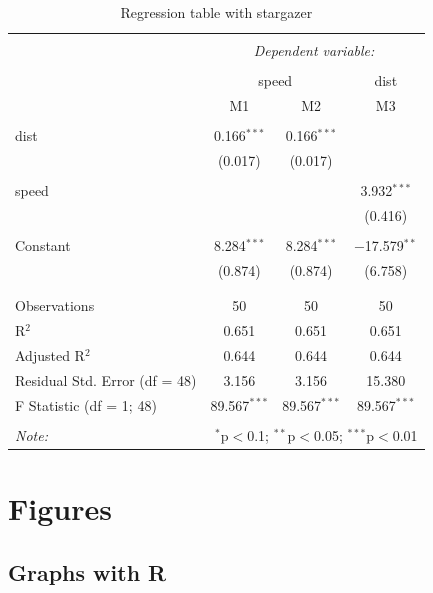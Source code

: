 \documentclass[
  12pt,
]{article}
\begin{document}
\begin{table}[h] \centering 
  \caption{Regression table with stargazer} 
  \label{tab2} 
\begin{tabular}{@{\extracolsep{5pt}}lccc} 
\\[-1.8ex]\hline 
\hline \\[-1.8ex] 
 & \multicolumn{3}{c}{\textit{Dependent variable:}} \\ 
\cline{2-4} 
\\[-1.8ex] & \multicolumn{2}{c}{speed} & dist \\ 
 & M1 & M2 & M3 \\ 
\hline \\[-1.8ex] 
 dist & 0.166$^{***}$ & 0.166$^{***}$ &  \\ 
  & (0.017) & (0.017) &  \\ 
  & & & \\ 
 speed &  &  & 3.932$^{***}$ \\ 
  &  &  & (0.416) \\ 
  & & & \\ 
 Constant & 8.284$^{***}$ & 8.284$^{***}$ & $-$17.579$^{**}$ \\ 
  & (0.874) & (0.874) & (6.758) \\ 
  & & & \\ 
\hline \\[-1.8ex] 
Observations & 50 & 50 & 50 \\ 
R$^{2}$ & 0.651 & 0.651 & 0.651 \\ 
Adjusted R$^{2}$ & 0.644 & 0.644 & 0.644 \\ 
Residual Std. Error (df = 48) & 3.156 & 3.156 & 15.380 \\ 
F Statistic (df = 1; 48) & 89.567$^{***}$ & 89.567$^{***}$ & 89.567$^{***}$ \\ 
\hline 
\hline \\[-1.8ex] 
\textit{Note:}  & \multicolumn{3}{r}{$^{*}$p$<$0.1; $^{**}$p$<$0.05; $^{***}$p$<$0.01} \\ 
\end{tabular} 
\end{table}

\hypertarget{figures}{%
\section{Figures}\label{figures}}

\hypertarget{graphs-with-r}{%
\subsection{Graphs with R}\label{graphs-with-r}}
\end{document}
